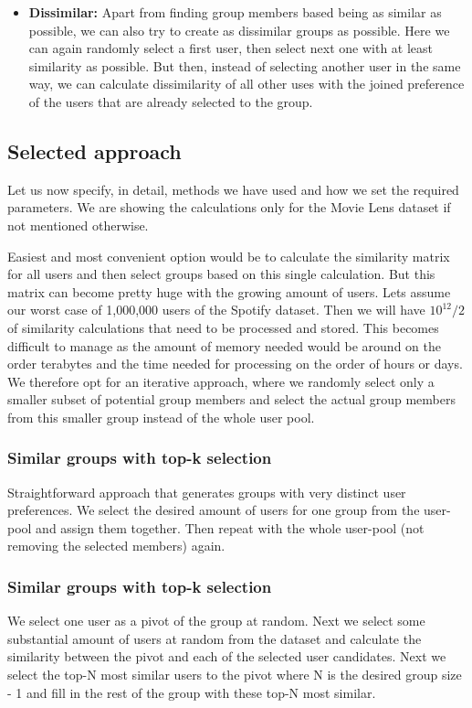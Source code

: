 \begin{itemize}
    \item \textbf{Dissimilar:}
        Apart from finding group members based being as similar as possible, we can also try to create as dissimilar groups as possible. Here we can again randomly select a first user, then select next one with at least similarity as possible. But then, instead of selecting another user in the same way, we can calculate dissimilarity of all other uses with the joined preference of the users that are already selected to the group.
\end{itemize}


\subsection{Selected approach}
Let us now specify, in detail, methods we have used and how we set the required parameters. We are showing the calculations only for the Movie Lens dataset if not mentioned otherwise.

Easiest and most convenient option would be to calculate the similarity matrix for all users and then select groups based on this single calculation. But this matrix can become pretty huge with the growing amount of users. Lets assume our worst case of 1,000,000 users of the Spotify dataset. Then we will have $10^{12}/2$ of similarity calculations that need to be processed and stored. This becomes difficult to manage as the amount of memory needed would be around on the order terabytes and the time needed for processing on the order of hours or days. We therefore opt for an iterative approach, where we randomly select only a smaller subset of potential group members and select the actual group members from this smaller group instead of the whole user pool.

\subsubsection{Similar groups with top-k selection}
Straightforward approach that generates groups with very distinct user preferences. We select the desired amount of users for one group from the user-pool and assign them together. Then repeat with the whole user-pool (not removing the selected members) again.

\subsubsection{Similar groups with top-k selection}
We select one user as a pivot of the group at random. Next we select some substantial amount of users at random from the dataset and calculate the similarity between the pivot and each of the selected user candidates. Next we select the top-N most similar users to the pivot where N is the desired group size - 1 and fill in the rest of the group with these top-N most similar.

